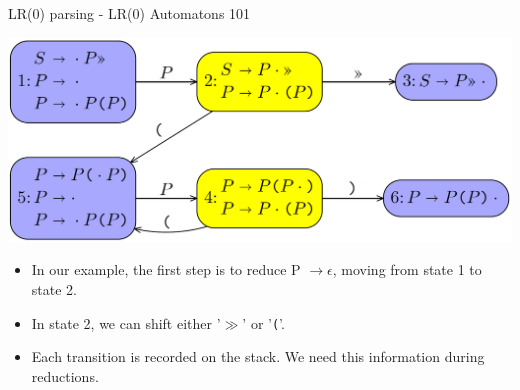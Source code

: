 \documentclass[10pt]{beamer}
\begin{document}
\begin{frame}[fragile]{LR(0) parsing - LR(0) Automatons 101}

\begin{center}
\includegraphics[scale=0.18]{lr0-automaton.png}
\end{center}

\begin{itemize}

\item In our example, the first step is to reduce P $\rightarrow \epsilon$, moving from state 1 to state 2.
\item In state 2, we can shift either '$\gg$' or '\texttt{(}'.
\item Each transition is recorded on the stack. We need this information during reductions.

\end{itemize}

\end{frame}
\end{document}
